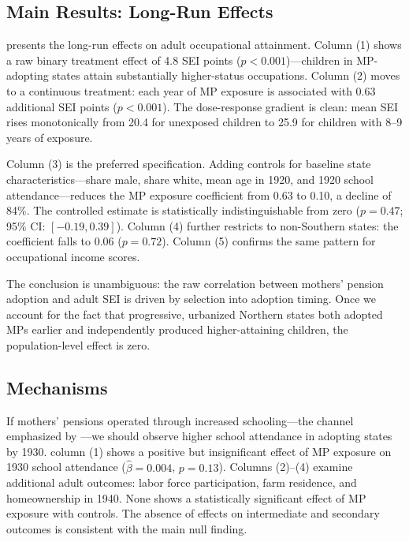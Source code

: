 \documentclass[12pt]{article}
\begin{document}
\subsection{Main Results: Long-Run Effects}



 presents the long-run effects on adult occupational attainment. Column (1) shows a raw binary treatment effect of 4.8 SEI points ($p < 0.001$)---children in MP-adopting states attain substantially higher-status occupations. Column (2) moves to a continuous treatment: each year of MP exposure is associated with 0.63 additional SEI points ($p < 0.001$). The dose-response gradient is clean: mean SEI rises monotonically from 20.4 for unexposed children to 25.9 for children with 8--9 years of exposure.

Column (3) is the preferred specification. Adding controls for baseline state characteristics---share male, share white, mean age in 1920, and 1920 school attendance---reduces the MP exposure coefficient from 0.63 to 0.10, a decline of 84\%. The controlled estimate is statistically indistinguishable from zero ($p = 0.47$; 95\% CI: $[-0.19, 0.39]$). Column (4) further restricts to non-Southern states: the coefficient falls to 0.06 ($p = 0.72$). Column (5) confirms the same pattern for occupational income scores.

The conclusion is unambiguous: the raw correlation between mothers' pension adoption and adult SEI is driven by selection into adoption timing. Once we account for the fact that progressive, urbanized Northern states both adopted MPs earlier and independently produced higher-attaining children, the population-level effect is zero.

\subsection{Mechanisms}



If mothers' pensions operated through increased schooling---the channel emphasized by \citet{aizer2016}---we should observe higher school attendance in adopting states by 1930.  column (1) shows a positive but insignificant effect of MP exposure on 1930 school attendance ($\hat{\beta} = 0.004$, $p = 0.13$). Columns (2)--(4) examine additional adult outcomes: labor force participation, farm residence, and homeownership in 1940. None shows a statistically significant effect of MP exposure with controls. The absence of effects on intermediate and secondary outcomes is consistent with the main null finding.
\end{document}
